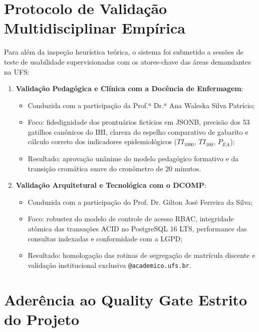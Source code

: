 \section{Protocolo de Validação Multidisciplinar Empírica}
\label{sec_validacao_multidisciplinar}

Para além da inspeção heurística teórica, o sistema foi submetido a sessões de teste de usabilidade supervisionadas com os atores-chave das áreas demandantes na UFS:
\begin{enumerate}
    \item \textbf{Validação Pedagógica e Clínica com a Docência de Enfermagem}:
    \begin{itemize}
        \item Conduzida com a participação da Prof.ª Dr.ª Ana Waleska Silva Patrício;
        \item Foco: fidedignidade dos prontuários fictícios em JSONB, precisão dos 53 gatilhos canônicos do IHI, clareza do espelho comparativo de gabarito e cálculo correto dos indicadores epidemiológicos ($TI_{1000}$, $TI_{100}$, $P_{EA}$);
        \item Resultado: aprovação unânime do modelo pedagógico formativo e da transição cromática suave do cronômetro de 20 minutos.
    \end{itemize}

    \item \textbf{Validação Arquitetural e Tecnológica com o DCOMP}:
    \begin{itemize}
        \item Conduzida com a participação do Prof. Dr. Gilton José Ferreira da Silva;
        \item Foco: robustez do modelo de controle de acesso RBAC, integridade atômica das transações ACID no PostgreSQL 16 LTS, performance das consultas indexadas e conformidade com a LGPD;
        \item Resultado: homologação das rotinas de segregação de matrícula discente e validação institucional exclusiva \texttt{@academico.ufs.br}.
    \end{itemize}
\end{enumerate}

\section{Aderência ao Quality Gate Estrito do Projeto}
\label{sec_quality_gate_ux}

